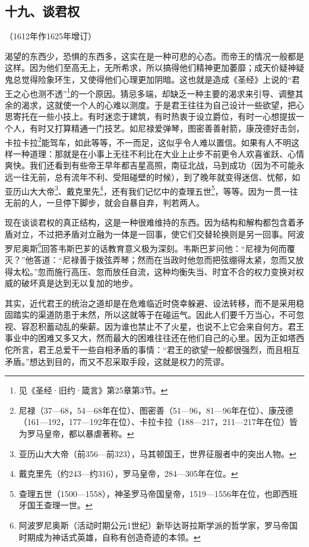 \subsection*{十九、谈君权}
\begin{center}
    （1612年作1625年增订）
\end{center}
\par 渴望的东西少，恐惧的东西多，这实在是一种可悲的心态。而帝王的情况一般都是这样。因为他们至高无上，无所希求，所以搞得他们精神更加萎靡；成天价疑神疑鬼总觉得险象环生，又使得他们心理更加阴暗。这也就是造成《圣经》上说的“君王之心也测不透”\footnote{见《圣经·旧约·箴言》第25章第3节。}的一个原因。猜忌多端，却缺乏一种主要的渴求来引导、调整其余的渴求，这就使一个人的心难以测度。于是君王往往为自己设计一些欲望，把心思寄托在一些小技上。有时迷恋于建筑，有时热衷于设立爵位，有时一心想提拔一个人，有时又打算精通一门技艺。如尼禄爱弹琴，图密善善射箭，康茂德好击剑，卡拉卡拉\footnote{尼禄（37—68，54—68年在位）、图密善（51—96，81—96年在位）、康茂德（161—192，177—192年在位）、卡拉卡拉（188—217，211—217年在位）皆为罗马皇帝，都以暴虐著称。}能驾车，如此等等，不一而足，这似乎令人难以置信。如果有人不明这样一种道理：那就是在小事上无往不利比在大业上止步不前更令人欢喜雀跃、心情爽快。我们还看到有些帝王早年都吉星高照，南征北战，马到成功（因为不可能永远一往无前，总有流年不利、受阻碰壁的时候），到了晚年就变得迷信、忧郁，如亚历山大大帝\footnote{亚历山大大帝（前356—前323），马其顿国王，世界征服者中的突出人物。}、戴克里先\footnote{戴克里先（约243—约316），罗马皇帝，284—305年在位。}，还有我们记忆中的查理五世\footnote{查理五世（1500—1558），神圣罗马帝国皇帝，1519—1556年在位，也即西班牙国王查理一世。}，等等。因为一贯一往无前的人，一旦停下脚步，就会自暴自弃，判若两人。
\par 现在谈谈君权的真正结构，这是一种很难维持的东西。因为结构和解构都包含着矛盾对立，不过把矛盾对立融为一体是一回事，使它们交替轮换则是另一回事。阿波罗尼奥斯\footnote{阿波罗尼奥斯（活动时期公元1世纪）新毕达哥拉斯学派的哲学家，罗马帝国时期成为神话式英雄，自称有创造奇迹的本领。}回答韦斯巴芗的话教育意义极为深刻。韦斯巴芗问他：“尼禄为何而覆灭？”他答道：“尼禄善于拨弦弄琴；然而在当政时他忽而把弦绷得太紧，忽而又放得太松。”忽而施行高压、忽而放任自流，这种均衡失当、时宜不合的权力变换对权威的破坏真是达到无以复加的地步。
\par 其实，近代君王的统治之道却是在危难临近时侥幸躲避、设法转移，而不是采用稳固踏实的渠道防患于未然，所以这就等于在碰运气。因此人们要千万当心，不可忽视、容忍积蓄动乱的柴薪。因为谁也禁止不了火星，也说不上它会来自何方。君王事业中的困难又多又大，然而最大的困难往往还在他们自己的心里。因为正如塔西佗所言，君王总爱干一些自相矛盾的事情：“君王的欲望一般都很强烈，而且相互矛盾。”想达到目的，而又不忍采取手段，这就是权力的荒谬。
